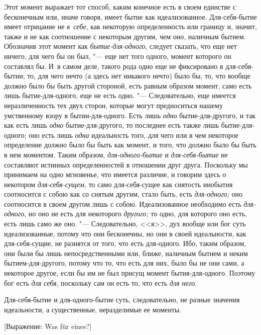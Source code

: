 Этот момент выражает тот способ, каким конечное есть в своем единстве с
бесконечным или, иначе говоря, имеет бытие как идеализованное.
Для-себя-бытие имеет отрицание не {\em в~себе}, как
некоторую определенность или границу и, значит, также и не как соотношение
с некоторым другим, чем оно, наличным бытием. Обозначив этот момент как
{\em бытие-для-одного}, следует сказать, что еще нет
ничего, для чего бы он был, "--- еще нет того одного, момент которого он
составлял бы. И~в самом деле, такого рода одно еще не фиксировано в
для-себя-бытии; то, для чего нечто (а здесь нет никакого нечто) было бы,
то, что вообще должно было бы быть другой стороной, есть равным образом
момент, само есть лишь бытие-для-одного, еще не есть одно. "--- Следовательно,
еще имеется неразличенность тех двух сторон, которые могут предноситься
нашему умственному взору в бытии-для-одного. Есть лишь
{\em одно} бытие-для-другого, и так как есть лишь
{\em одно} бытие-для-другого, то последнее есть также
лишь бытие-для-одного; оно есть лишь {\em одна}
идеальность того, для чего или в чем некоторое определение должно было бы
быть как момент, и того, что должно было бы быть в нем моментом. Таким
образом, {\em для-одного-бытие} и
{\em для-себя-бытие} не составляют истинных
определенностей в отношении друг друга. Поскольку мы принимаем на одно
мгновенье, что имеется различие, и говорим здесь о некотором
{\em для-себя-сущем}, то само для-себя-сущее как
снятость инобытия соотносится с собою как со снятым другим, стало быть,
есть {\em для-одного;} оно соотносится в своем другом
лишь с собою. Идеализованное необходимо есть
{\em для-одного}, но оно не есть для некоторого
{\em другого;} то одно, для которого оно есть, есть
лишь само же оно. "--- Следовательно, <<я>>, дух вообще или бог суть
идеализованные, потому что они бесконечны, но они в своей идеальности, как
для-себя-сущие, не разнятся от того, что есть для-одного. Ибо, таким
образом, они были бы лишь непосредственными или, ближе, наличным бытием и
неким бытием-для-другого, потому что то, что есть для них, было бы не они
сами, а некоторое другое, если бы им не был присущ момент бытия-для-одного.
Поэтому бог есть {\em для себя}, поскольку сам он есть
то, что есть {\em для него}.

Для-себя-бытие и для-одного-бытие суть, следовательно, не разные значения
идеальности, а существенные, неразделимые ее моменты.

%
{[Выражение: Was für eines?]}


